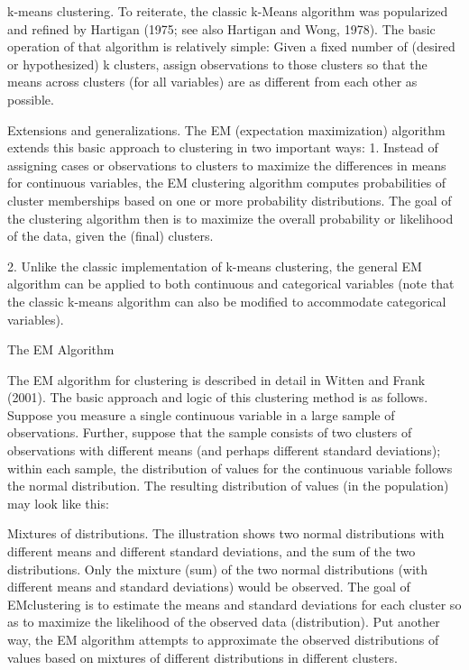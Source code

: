 k-means clustering. To reiterate, the classic k-Means algorithm was popularized and refined by Hartigan (1975; see also Hartigan and Wong, 1978). The basic operation of that algorithm is relatively simple: Given a fixed number of (desired or hypothesized) k clusters, assign observations to those clusters so that the means across clusters (for all variables) are as different from each other as possible.

Extensions and generalizations. The EM (expectation maximization) algorithm extends this basic approach to clustering in two important ways:
1.
Instead of assigning cases or observations to clusters to maximize the differences in means for continuous variables, the EM clustering algorithm computes probabilities of cluster memberships based on one or more probability distributions. The goal of the clustering algorithm then is to maximize the overall probability or likelihood of the data, given the (final) clusters.

2.
Unlike the classic implementation of k-means clustering, the general EM algorithm can be applied to both continuous and categorical variables (note that the classic k-means algorithm can also be modified to accommodate categorical variables).


The EM Algorithm

The EM algorithm for clustering is described in detail in Witten and Frank (2001). The basic approach and logic of this clustering method is as follows. Suppose you measure a single continuous variable in a large sample of observations. Further, suppose that the sample consists of two clusters of observations with different means (and perhaps different standard deviations); within each sample, the distribution of values for the continuous variable follows the normal distribution. The resulting distribution of values (in the population) may look like this:



Mixtures of distributions. The illustration shows two normal distributions with different means and different standard deviations, and the sum of the two distributions. Only the mixture (sum) of the two normal distributions (with different means and standard deviations) would be observed. The goal of EMclustering is to estimate the means and standard deviations for each cluster so as to maximize the likelihood of the observed data (distribution). Put another way, the EM algorithm attempts to approximate the observed distributions of values based on mixtures of different distributions in different clusters.

